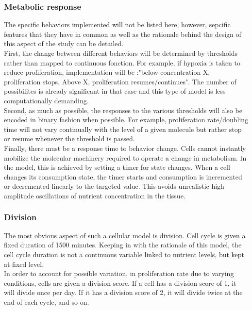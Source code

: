 \documentclass[11pt,a4paper]{article}
\begin{document}
\subsubsection{Metabolic response}
The specific behaviors implemented will not be listed here, however, sepcific features that they have in common as well as the rationale  behind the design of this aspect of the study can be detailed. \\

First, the change between different behaviors will be determined by thresholds rather than mapped to continuous fonction. For example, if hypoxia is taken to reduce proliferation, implementation will be :"below concentration X, proliferation stops. Above X, proliferation resumes/continues". The number of possibilites is already significant in that case and this type of model is less computationally demanding.\\

Second, as much as possible, the responses to the various thresholds will also be encoded in binary fashion when possible. For example, proliferation rate/doubling time will not vary continually with the level of a given molecule but rather stop or resume whenever the threshold is passed.\\

Finally, there must be a response time to behavior change. Cells cannot instantly mobilize the molecular machinery required to operate a change in metabolism. In the model, this is achieved by setting a timer for state changes. When a cell changes its consumption state, the timer starts and consumption is incremented or decremented linearly to the targeted value. This avoids unrealistic high amplitude oscillations of nutrient concentration in the tissue.
 
\subsubsection{Division}
The most obvious aspect of such a cellular model is division. Cell cycle is given a fixed duration of 1500 minutes. Keeping in with the rationale of this model, the cell cycle duration is not a continuous variable linked to nutrient levels, but kept at fixed level.\\

In order to account for possible variation, in proliferation rate due to varying conditions, cells are given a division score. If a cell has a division score of 1, it will divide once per day. If it has a division score of 2, it will divide twice at the end of each cycle, and so on.\\
\end{document}
